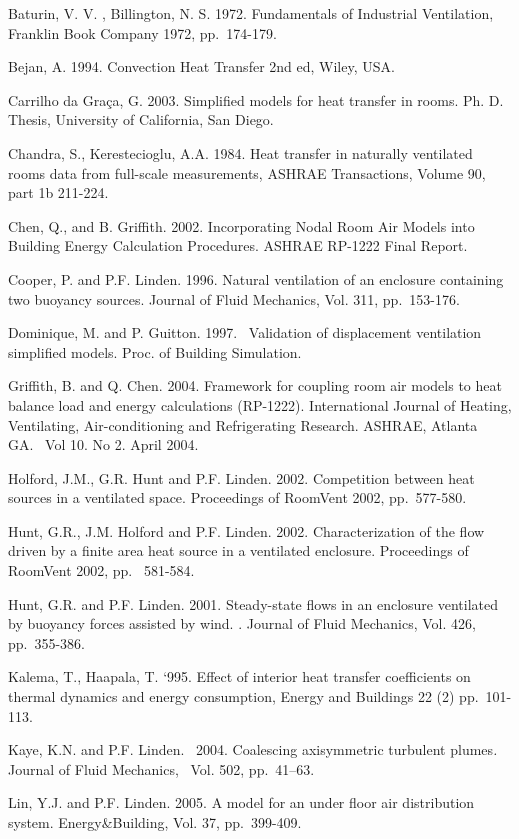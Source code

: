Baturin, V. V. , Billington, N. S. 1972. Fundamentals of Industrial Ventilation, Franklin Book Company 1972, pp.~174-179.

Bejan, A. 1994. Convection Heat Transfer 2nd ed, Wiley, USA.

Carrilho da Gra\c{c}a, G. 2003. Simplified models for heat transfer in rooms. Ph. D. Thesis, University of California, San Diego.

Chandra, S., Kerestecioglu, A.A. 1984. Heat transfer in naturally ventilated rooms data from full-scale measurements, ASHRAE Transactions, Volume 90, part 1b 211-224.

Chen, Q., and B. Griffith. 2002. Incorporating Nodal Room Air Models into Building Energy Calculation Procedures. ASHRAE RP-1222 Final Report.

Cooper, P. and P.F. Linden. 1996. Natural ventilation of an enclosure containing two buoyancy sources. Journal of Fluid Mechanics, Vol. 311, pp.~153-176.

Dominique, M. and P. Guitton. 1997.~ Validation of displacement ventilation simplified models. Proc. of Building Simulation.

Griffith, B. and Q. Chen. 2004. Framework for coupling room air models to heat balance load and energy calculations (RP-1222). International Journal of Heating, Ventilating, Air-conditioning and Refrigerating Research. ASHRAE, Atlanta GA.~ Vol 10. No 2. April 2004.

Holford, J.M., G.R. Hunt and P.F. Linden. 2002. Competition between heat sources in a ventilated space. Proceedings of RoomVent 2002, pp.~577-580.

Hunt, G.R., J.M. Holford and P.F. Linden. 2002. Characterization of the flow driven by a finite area heat source in a ventilated enclosure. Proceedings of RoomVent 2002, pp.~ 581-584.

Hunt, G.R. and P.F. Linden. 2001. Steady-state flows in an enclosure ventilated by buoyancy forces assisted by wind. . Journal of Fluid Mechanics, Vol. 426,~ pp.~355-386.

Kalema, T., Haapala, T. `995. Effect of interior heat transfer coefficients on thermal dynamics and energy consumption, Energy and Buildings 22 (2) pp.~101-113.

Kaye, K.N. and P.F. Linden.~ 2004. Coalescing axisymmetric turbulent plumes\emph{.} Journal of Fluid Mechanics, ~Vol. 502, pp.~41--63.

Lin, Y.J. and P.F. Linden. 2005. A model for an under floor air distribution system. Energy\&Building, Vol. 37, pp.~399-409.

